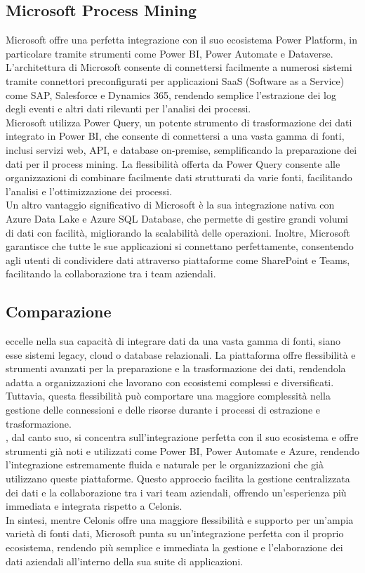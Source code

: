 \documentclass{article}
\newcommand{\custombold}{\contour{black}}
\begin{document}
\subsection{Microsoft Process Mining}
Microsoft offre una perfetta integrazione con il suo ecosistema Power Platform, in particolare tramite strumenti come Power BI, Power Automate e Dataverse. L'architettura di Microsoft consente di connettersi facilmente a numerosi sistemi tramite connettori preconfigurati per applicazioni SaaS (Software as a Service) come SAP, Salesforce e Dynamics 365, rendendo semplice l'estrazione dei log degli eventi e altri dati rilevanti per l'analisi dei processi.\\
Microsoft utilizza Power Query, un potente strumento di trasformazione dei dati integrato in Power BI, che consente di connettersi a una vasta gamma di fonti, inclusi servizi web, API, e database on-premise, semplificando la preparazione dei dati per il process mining. La flessibilità offerta da Power Query consente alle organizzazioni di combinare facilmente dati strutturati da varie fonti, facilitando l'analisi e l'ottimizzazione dei processi.\\
Un altro vantaggio significativo di Microsoft è la sua integrazione nativa con Azure Data Lake e Azure SQL Database, che permette di gestire grandi volumi di dati con facilità, migliorando la scalabilità delle operazioni. Inoltre, Microsoft garantisce che tutte le sue applicazioni si connettano perfettamente, consentendo agli utenti di condividere dati attraverso piattaforme come SharePoint e Teams, facilitando la collaborazione tra i team aziendali.

\subsection{Comparazione}
\custombold{Celonis} eccelle nella sua capacità di integrare dati da una vasta gamma di fonti, siano esse sistemi legacy, cloud o database relazionali. La piattaforma offre flessibilità e strumenti avanzati per la preparazione e la trasformazione dei dati, rendendola adatta a organizzazioni che lavorano con ecosistemi complessi e diversificati. Tuttavia, questa flessibilità può comportare una maggiore complessità nella gestione delle connessioni e delle risorse durante i processi di estrazione e trasformazione.\\
\custombold{Microsoft Process Mining}, dal canto suo, si concentra sull'integrazione perfetta con il suo ecosistema e offre strumenti già noti e utilizzati come Power BI, Power Automate e Azure, rendendo l'integrazione estremamente fluida e naturale per le organizzazioni che già utilizzano queste piattaforme. Questo approccio facilita la gestione centralizzata dei dati e la collaborazione tra i vari team aziendali, offrendo un'esperienza più immediata e integrata rispetto a Celonis.\\
In sintesi, mentre Celonis offre una maggiore flessibilità e supporto per un'ampia varietà di fonti dati, Microsoft punta su un'integrazione perfetta con il proprio ecosistema, rendendo più semplice e immediata la gestione e l'elaborazione dei dati aziendali all'interno della sua suite di applicazioni.
\end{document}
